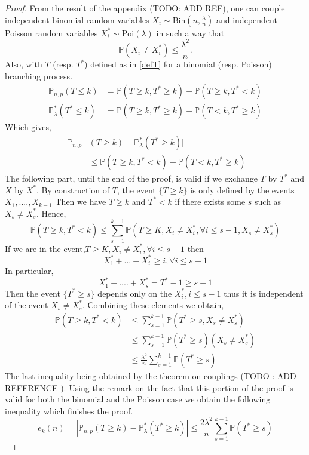 \begin{proof}
	From the result of the appendix (TODO: ADD REF), one can couple independent binomial random variables $X_i \sim \text{Bin}(n, \frac{\lambda}{n})$
	and independent Poisson random variables $X_i^* \sim \text{Poi}(\lambda)$ in such a way that
	\begin{equation}
		\mathbb{P}(X_i \neq X_i^*) \leq \frac{\lambda^2}{n}.
	\end{equation}
	Also, with $T$ (resp. $T^*$) defined as in \eqref{defT} for a binomial (resp. Poisson) branching process.
	\begin{align}
		\mathbb{P}_{n,p}(T\leq k) &= \mathbb{P}(T\geq k, T^* \geq k) +\mathbb{P}(T\geq k, T^* < k)\\
		\mathbb{P}_{\lambda}^*(T^*\leq k) &= \mathbb{P}(T\geq k, T^* \geq k) +\mathbb{P}(T< k, T^* \geq k)
	\end{align}
	Which gives,
	\begin{align}
		|\mathbb{P}_{n, p}&(T \geq k) -\mathbb{P}_{\lambda}^*(T^* \geq k)|\\
				  &\leq  \mathbb{P}(T\geq k, T^* < k) +\mathbb{P}(T< k, T^* \geq k)
	\end{align}
	The following part, until the end of the proof, is valid if we exchange $T$ by $T^*$ and $X$ by $X^*$.
	\newline
	By construction of $T$, the event $\{T\geq k\}$ is only defined by the events $X_1, ...., X_{k-1}$
	Then we have $T\geq k$ and $T^*<k$ if there exists some $s$ such as $X_s \neq X_s^*$.
	Hence, 
	\begin{equation}
		\mathbb{P}(T\geq k, T^*<k) \leq \sum_{s=1}^{k-1}\mathbb{P}(T \geq K, X_i \neq X_i^*, \forall i \leq s-1, X_s \neq X_s^*)
	\end{equation}
	If we are in the event,$T \geq K, X_i \neq X_i^*, \forall i \leq s-1$ then
	\begin{equation}
		X_1^*+...+X_i^* \geq i, \forall i \leq s-1
	\end{equation}
	In particular,
	\begin{equation}
		X_1^*+....+X_s^* = T^* - 1 \geq s-1
	\end{equation}
	Then the event $\{T^* \geq s\}$ depends only on the $X_i^*, i\leq s-1$ thus it is independent of the event $X_s \neq X_s^*$.
	Combining these elements we obtain,
	\begin{align}
		\mathbb{P}(T\geq k, T^* < k) &\leq \sum_{s=1}^{k-1} \mathbb{P}(T^* \geq s, X_s \neq X_s^*) 	\\
					     &\leq  \sum_{s=1}^{k-1} \mathbb{P}(T^* \geq s)(X_s \neq X_s^*) 	\\
					     &\leq  \frac{\lambda ^2}{n} \sum_{s=1}^{k-1} \mathbb{P}(T^* \geq s) 
	\end{align}
	The last inequality being obtained by the theorem on couplings (TODO : ADD REFERENCE ).
	Using the remark on the fact that this portion of the proof is valid for both the binomial and the Poisson case we obtain the following inequality which finishes the proof.
	\begin{equation}
		e_k(n) = |\mathbb{P}_{n, p}(T \geq k) -\mathbb{P}_{\lambda}^*(T^* \geq k)| \leq \frac{2\lambda ^2}{n}\sum_{s=1}^{k-1} \mathbb{P}(T^* \geq s)
	\end{equation}
\end{proof}
